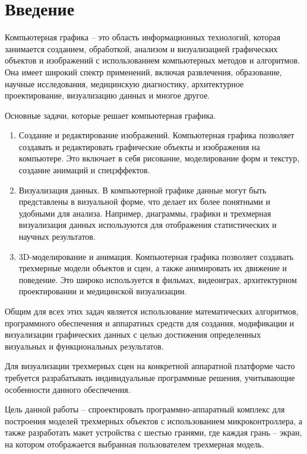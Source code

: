 \chapter*{Введение}

Компьютерная графика -- это область информационных технологий, которая занимается созданием, обработкой, анализом и визуализацией графических объектов и изображений с использованием компьютерных методов и алгоритмов. 
Она имеет широкий спектр применений, включая развлечения, образование, научные исследования, медицинскую диагностику, архитектурное проектирование, визуализацию данных и многое другое.

Основные задачи, которые решает компьютерная графика.
\begin{enumerate}[label={\arabic*)}]
	\item Создание и редактирование изображений. 
    Компьютерная графика позволяет создавать и редактировать графические объекты и изображения на компьютере. 
    Это включает в себя рисование, моделирование форм и текстур, создание анимаций и спецэффектов.
    \item Визуализация данных. 
    В компьютерной графике данные могут быть представлены в визуальной форме, что делает их более понятными и удобными для анализа. 
    Например, диаграммы, графики и трехмерная визуализация данных используются для отображения статистических и научных результатов.
    \item 3D-моделирование и анимация. 
    Компьютерная графика позволяет создавать трехмерные модели объектов и сцен, а также анимировать их движение и поведение. 
    Это широко используется в фильмах, видеоиграх, архитектурном проектировании и медицинской визуализации.
\end{enumerate}

Общим для всех этих задач является использование математических алгоритмов, программного обеспечения и аппаратных средств для создания, модификации и визуализации графических данных с целью достижения определенных визуальных и функциональных результатов.

Для визуализации трехмерных сцен на конкретной аппаратной платформе часто требуется разрабатывать индивидуальные программные решения, учитывающие особенности данного обеспечения.

Цель данной работы -- спроектировать программно-аппаратный комплекс для построения моделей трехмерных объектов с использованием микроконтроллера, а также разработать макет устройства с шестью гранями, где  каждая грань -- экран, на котором отображается выбранная пользователем трехмерная модель. 


